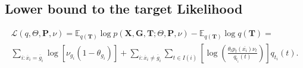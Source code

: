 \documentclass[10pt]{article}
\begin{document}
\subsection{Lower bound to the target Likelihood}
\begin{gather}
    \nonumber
    \mathcal L(q, \Theta, \mathbf P, \nu) = 
    \mathbb E_{q(\mathbf T)} \log p(\mathbf X, \mathbf G, \mathbf T; \Theta, \mathbf P, \nu) -
    \mathbb E_{q(\mathbf T)} \log q(\mathbf T) = \\
    \sum_{i: \overline x_i = \overline g_i} \log [\nu_{g_i}(1 - \theta_{g_i})] + 
    \sum_{i: \overline x_i \neq \overline g_i} \sum_{t \in I(i)} 
        \left[\log\left(\frac{\theta_{t} p_{t}(\overline{x_i}) \nu_t}{q_{t_i}(t)}\right)\right] q_{t_i}(t).
\end{gather}
\end{document}

